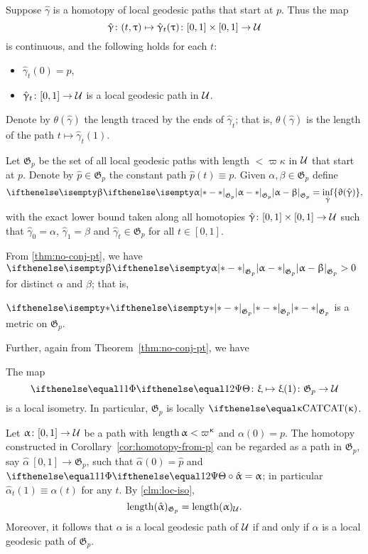 Suppose $\hat\gamma$ is a homotopy of local geodesic paths that start at $p$.  Thus the map 
\[\hat\gamma\:(t,\tau)\mapsto\hat\gamma_t(\tau)\:[0,1]\times[0,1]\to\spc{U}\] 
is continuous,
and the following holds for each $t$:
\begin{itemize}
\item $\hat\gamma_t(0)=p$,
\item $\hat\gamma_t\:[0,1]\to\spc{U}$ is a local geodesic path in $\mathcal{U}$.
\end{itemize}

Denote by $\theta(\hat\gamma)$ the length traced by the ends of $\hat\gamma_t$;
that is, $\theta(\hat\gamma)$ is the length of the path $t\mapsto\hat\gamma_t(1)$.

Let $\mathfrak{G}_p$ be the set of all local geodesic paths 
with length $<\varpi\kappa$ in $\mathcal{U}$ that start at $p$.
Denote by $\hat p\in \mathfrak{G}_p$ the constant path $\hat p(t)\equiv p$.
Given $\alpha,\beta\in \mathfrak{G}_p$ define
\[
\dist{\alpha}{\beta}{\mathfrak{G}_p}
=
\inf_{\hat\gamma} \{\theta(\hat\gamma)\},\]
with the exact lower bound taken along all homotopies 
$\hat\gamma\:[0,1]\times[0,1]\to\spc{U}$ 
such that 
$\hat\gamma_0=\alpha$, 
$\hat\gamma_1=\beta$ 
and $\hat\gamma_t\in \mathfrak{G}_p$ for all $t\in[0,1]$.

From \ref{thm:no-conj-pt}, we have $\dist{\alpha}{\beta}{\mathfrak{G}_p}>0$ for distinct $\alpha$ and $\beta$;
that is,

\begin{clm}{}
$\dist{{*}}{{*}}{\mathfrak{G}_p}$ is a metric on $\mathfrak{G}_p$.
\end{clm}

Further, again from Theorem~\ref{thm:no-conj-pt}, we have

\begin{clm}{}\label{clm:loc-iso}
The map
\[\map\:\xi\mapsto\xi(1)\:\mathfrak{G}_p\to\spc{U}\]
is a local isometry.
In particular, $\mathfrak{G}_p$ is locally $\CAT\kappa$.
\end{clm}

Let $\alpha\:[0,1]\to\spc{U}$ be a path with $\length\alpha<\varpi\kappa$ and $\alpha(0)=p$.
The homotopy constructed in Corollary~\ref{cor:homotopy-from-p} 
can be regarded as a path in $\mathfrak{G}_p$, say $\hat\alpha\:[0,1]\to \mathfrak{G}_p$,
such that $\hat\alpha(0)=\hat p$ and $\map\circ\hat\alpha=\alpha$; in particular $\hat\alpha_t(1)\equiv\alpha(t)$ for any $t$. 
By \ref{clm:loc-iso}, 
\[\mathop{\rm length}\nolimits(\hat{\upalpha})_{\mathfrak{G}_p}=\mathop{\rm length}\nolimits(\upalpha)_{\mathcal{U}}.\]
Moreover, it follows that $\alpha$ is a local geodesic path of $\mathcal{U}$  if and only if $\hat\alpha$ is a local geodesic path of $\mathfrak{G}_p$.


